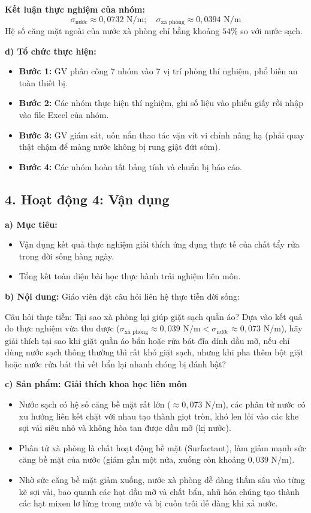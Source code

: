 \documentclass[12pt, a4paper]{article}
\begin{document}
\noindent \textbf{Kết luận thực nghiệm của nhóm:}
$$\sigma_{\text{nước}} \approx 0{,}0732\text{ N/m}; \quad \sigma_{\text{xà phòng}} \approx 0{,}0394\text{ N/m}$$
Hệ số căng mặt ngoài của nước xà phòng chỉ bằng khoảng $54\%$ so với nước sạch.

\noindent \textbf{d) Tổ chức thực hiện:}
\begin{itemize}
    \item \textbf{Bước 1:} GV phân công 7 nhóm vào 7 vị trí phòng thí nghiệm, phổ biến an toàn thiết bị.
    \item \textbf{Bước 2:} Các nhóm thực hiện thí nghiệm, ghi số liệu vào phiếu giấy rồi nhập vào file Excel của nhóm.
    \item \textbf{Bước 3:} GV giám sát, uốn nắn thao tác vặn vít vi chỉnh nâng hạ (phải quay thật chậm để màng nước không bị rung giật đứt sớm).
    \item \textbf{Bước 4:} Các nhóm hoàn tất bảng tính và chuẩn bị báo cáo.
\end{itemize}

\subsection*{4. Hoạt động 4: Vận dụng}

\noindent \textbf{a) Mục tiêu:}
\begin{itemize}
    \item Vận dụng kết quả thực nghiệm giải thích ứng dụng thực tế của chất tẩy rửa trong đời sống hàng ngày.
    \item Tổng kết toàn diện bài học thực hành trải nghiệm liên môn.
\end{itemize}

\noindent \textbf{b) Nội dung:}
Giáo viên đặt câu hỏi liên hệ thực tiễn đời sống:
\begin{pedabox}{Câu hỏi thực tiễn: Tại sao xà phòng lại giúp giặt sạch quần áo?}
    Dựa vào kết quả đo thực nghiệm vừa thu được ($\sigma_{\text{xà phòng}} \approx 0{,}039\text{ N/m} < \sigma_{\text{nước}} \approx 0{,}073\text{ N/m}$), hãy giải thích tại sao khi giặt quần áo bẩn hoặc rửa bát đĩa dính dầu mỡ, nếu chỉ dùng nước sạch thông thường thì rất khó giặt sạch, nhưng khi pha thêm bột giặt hoặc nước rửa bát thì vết bẩn lại nhanh chóng bị đánh bật?
\end{pedabox}

\noindent \textbf{c) Sản phẩm: Giải thích khoa học liên môn}
\begin{itemize}
    \item Nước sạch có hệ số căng bề mặt rất lớn ($\approx 0{,}073\text{ N/m}$), các phân tử nước có xu hướng liên kết chặt với nhau tạo thành giọt tròn, khó len lỏi vào các khe sợi vải siêu nhỏ và không hòa tan được dầu mỡ (kị nước).
    \item Phân tử xà phòng là chất hoạt động bề mặt (Surfactant), làm giảm mạnh sức căng bề mặt của nước (giảm gần một nửa, xuống còn khoảng $0{,}039\text{ N/m}$).
    \item Nhờ sức căng bề mặt giảm xuống, nước xà phòng dễ dàng thấm sâu vào từng kẽ sợi vải, bao quanh các hạt dầu mỡ và chất bẩn, nhũ hóa chúng tạo thành các hạt mixen lơ lửng trong nước và bị cuốn trôi dễ dàng khi xả nước.
\end{itemize}
\end{document}
